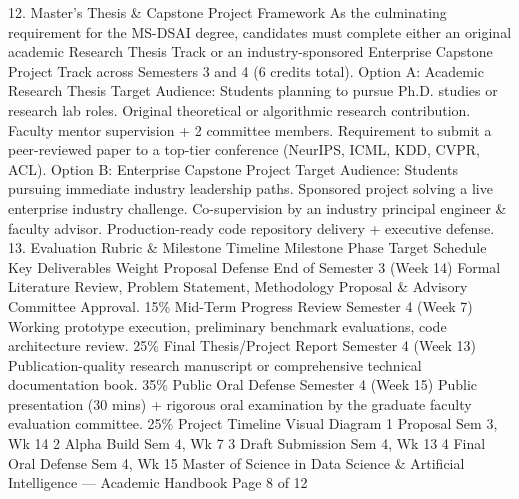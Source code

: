 \documentclass[12pt]{article}
\begin{document}
12. Master's Thesis \& Capstone Project Framework
As the culminating requirement for the MS-DSAI degree, candidates must complete either an original academic
Research Thesis Track or an industry-sponsored Enterprise Capstone Project Track across Semesters 3 and 4 (6
credits total).
Option A: Academic Research Thesis
Target Audience: Students planning to pursue Ph.D.
studies or research lab roles.
Original theoretical or algorithmic research contribution.
Faculty mentor supervision + 2 committee members.
Requirement to submit a peer-reviewed paper to a top-tier
conference (NeurIPS, ICML, KDD, CVPR, ACL).
Option B: Enterprise Capstone Project
Target Audience: Students pursuing immediate industry
leadership paths.
Sponsored project solving a live enterprise industry
challenge.
Co-supervision by an industry principal engineer \& faculty
advisor.
Production-ready code repository delivery + executive
defense.
13. Evaluation Rubric \& Milestone Timeline
Milestone Phase
Target Schedule
Key Deliverables
Weight
Proposal Defense
End of Semester 3
(Week 14)
Formal Literature Review, Problem Statement, Methodology
Proposal \& Advisory Committee Approval.
15\%
Mid-Term Progress
Review
Semester 4 (Week 7)
Working prototype execution, preliminary benchmark evaluations,
code architecture review.
25\%
Final Thesis/Project
Report
Semester 4 (Week
13)
Publication-quality research manuscript or comprehensive
technical documentation book.
35\%
Public Oral Defense
Semester 4 (Week
15)
Public presentation (30 mins) + rigorous oral examination by the
graduate faculty evaluation committee.
25\%
Project Timeline Visual Diagram
1
Proposal
Sem 3, Wk 14
2
Alpha Build
Sem 4, Wk 7
3
Draft Submission
Sem 4, Wk 13
4
Final Oral Defense
Sem 4, Wk 15
Master of Science in Data Science \& Artificial Intelligence — Academic Handbook
Page 8 of 12
\end{document}
